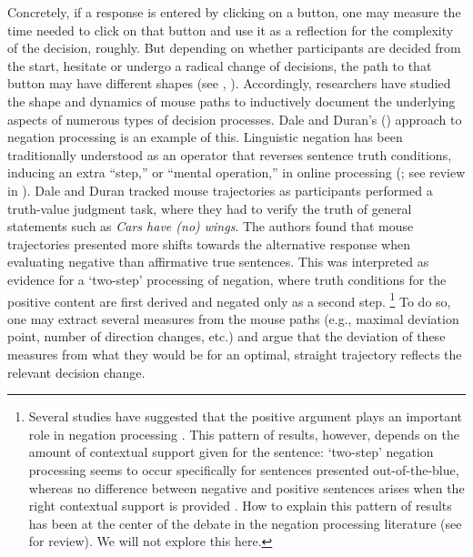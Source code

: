 \documentclass[draft]{article}
\newcommand{\nbEC}[1]{{\leavevmode\color{blue}{\scriptsize#1}}}
\begin{document}
%
Concretely, if a response is entered by clicking on a button, one may measure the time needed to click on that button and use it as a reflection for the complexity of the decision, roughly. But depending on whether participants are decided from the start, hesitate or undergo a radical change of decisions, the path to that button may have different shapes (see , \citealp{Wojnowicz2009}). %
Accordingly, researchers have studied the shape and dynamics of mouse paths to inductively document the underlying aspects of numerous types of decision processes. Dale and Duran's (\citeyear{Dale2011}) approach to negation processing is an example of this.   
Linguistic negation has been traditionally understood as an operator that reverses sentence truth conditions, inducing an extra ``step,'' or ``mental operation,'' in online processing (\citealp{wason1965contexts,wason1972psychology}; see review in \citealp{Tian2016}). %
Dale and Duran tracked mouse trajectories as participants performed a truth-value judgment task, where they had to verify the truth of general statements such as \textit{Cars have (no) wings}.
%
The authors found that mouse trajectories presented more shifts towards the alternative response when evaluating negative than affirmative true sentences. This was interpreted as evidence for a `two-step' processing of negation, where truth conditions for the positive content are first derived and negated only as a second step.%
%
\footnote{Several studies have suggested that the positive argument plays an important role in negation processing \citep[among others]{kaup2007experiential,ludtke2008event}.  
This pattern of results, however, depends on the amount of contextual support given for the sentence: `two-step' negation processing seems to occur specifically for sentences presented out-of-the-blue, whereas no difference between negative and positive sentences arises when the right contextual support is provided \citep{nieuwland2008truth,tian2010we}. How to explain this pattern of results has been at the center of the debate in the negation processing literature (see \citealp{Tian2016} for review). We will not explore this here.}
To do so, one may extract several measures from the mouse paths (e.g., maximal deviation point, number of direction changes, etc.) and argue that the deviation of these measures from what they would be for an optimal, straight trajectory reflects the relevant decision change.
\end{document}
